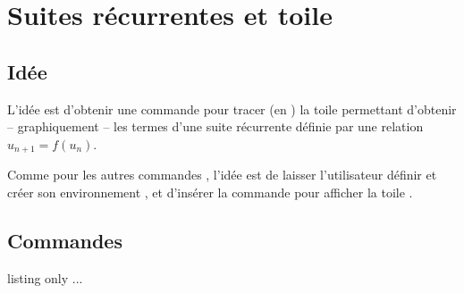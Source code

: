 \newpage

\section{Suites récurrentes et \og toile \fg}\label{recurr}

\subsection{Idée}

\begin{tipblock}
L'idée est d'obtenir une commande pour tracer (en \TikZ) la \og toile \fg{} permettant d'obtenir -- graphiquement -- les termes d'une suite récurrente définie par une relation $u_{n+1}=f(u_n)$.

\smallskip

Comme pour les autres commandes \TikZ, l'idée est de laisser l'utilisateur définir et créer son environnement \TikZ, et d'insérer la commande  pour afficher la \og toile \fg.
\end{tipblock}

\subsection{Commandes}

\begin{PresCodeTexPL}{listing only}
...
\end{PresCodeTexPL}

